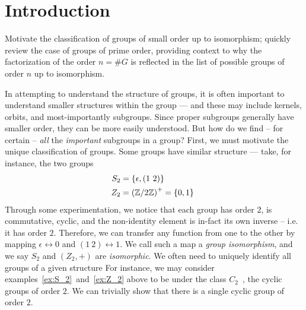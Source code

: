 \section{Introduction}\label{sec:intro}

\begin{Answer}
  Motivate the classification of groups of small order up to isomorphism; 
  quickly review the case of groups of prime order, providing context to why the 
  factorization of the order $n=\#G$ is reflected in the list of possible groups of 
  order $n$ up to isomorphism.
\end{Answer}

In attempting to understand the structure of groups,
it is often important to understand smaller structures within the group ---
and these may include kernels, orbits, and most-importantly subgroups.
Since proper subgroups generally have smaller order,
they can be more easily understood.
But how do we find -- for certain -- \emph{all} the \emph{important} subgroups
in a group? 
First, we must motivate the unique classification of groups.
Some groups have similar structure --- take, for instance,
the two groups
\begin{align}
  S_2 &= \{ \epsilon, (1\ 2) \}~\label{ex:S_2} \\
  Z_2 &= {(\mathbb{Z}/2\mathbb{Z})}^+ = \{ 0, 1 \}~\label{ex:Z_2}
\end{align}
Through some experimentation, we notice
that each group has order $2$, is commutative, cyclic, and the non-identity element is in-fact
its own inverse -- i.e. it has order $2$. Therefore, we can transfer
any function from one to the other by mapping $\epsilon \leftrightarrow 0$
and $(1\ 2) \leftrightarrow 1$. We call such a map a \emph{group isomorphism},
and we say $S_2$ and $(Z_2, +)$ are \emph{isomorphic}.
We often need to uniquely identify all groups of a given structure
For instance, we may consider examples~\ref{ex:S_2}~and~\ref{ex:Z_2} above to be
under the class $C_2$~\label{def:C_2}, the cyclic groups of order $2$.
We can trivially show that there is a single cyclic group of order $2$.



